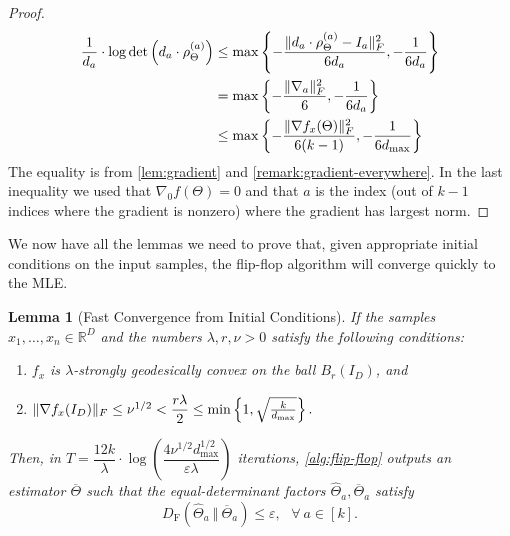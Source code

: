 \documentclass[aos]{imsart}
\newtheorem{lemma}[theorem]{Lemma}
\theoremstyle{definition}
\numberwithin{equation}{section}
\DeclarePairedDelimiter{\norm}{\lVert}{\rVert}
\newcommand{\R}{{\mathbb{R}}}
\newcommand{\otheta}{\overline{\Theta}}
\newcommand{\htheta}{\widehat{\Theta}}
\newcommand{\eps}{\varepsilon}
\newcommand{\DF}{D_{\operatorname{F}}}
\def\dmax{d_{\max}}
\begin{document}
\begin{proof}
	\begin{align*}
		\frac{1}{d_a} \cdot  \log\det\left(d_a \cdot \rho_\Theta^{(a)} \right) &\leq\max\left\{ - \dfrac{\norm{d_a \cdot \rho_\Theta^{(a)} - I_a}_F^2}{6 d_a}, -\dfrac{1}{6 d_a}\right\} \\
		&= \max\left\{ - \dfrac{\norm{\nabla_a}_F^2 }{6}, -\dfrac{1}{6 d_a}\right\}\\
		&\leq \max\left\{ - \dfrac{\norm{\nabla f_x(\Theta)}_F^2}{6(k-1)}, -\dfrac{1}{6 \dmax}\right\}
	\end{align*}
The equality is from \cref{lem:gradient} and \cref{remark:gradient-everywhere}. In the last inequality we used that $\nabla_0 f(\Theta) = 0$ and that $a$ is the index (out of $k-1$ indices where the gradient is nonzero) where the gradient has largest norm.
\end{proof}

We now have all the lemmas we need to prove that, given appropriate initial conditions on the input samples, the flip-flop algorithm will converge quickly to the MLE.

\begin{lemma}[Fast Convergence from Initial Conditions]\label{lem:fast-convergence-initial-generic}
	If the samples $x_1, \ldots, x_n \in \R^D$ and the numbers $\lambda, r, \nu > 0$ satisfy the following conditions:
	\begin{enumerate}
		\item $f_x$ is $\lambda$-strongly geodesically convex on the ball $B_r(I_D)$, and
		\item $\norm{\nabla f_x (I_D)}_F \leq \nu^{1/2} < \dfrac{r \lambda}{2} \leq \min\left\{1, \sqrt{\frac{k}{\dmax}}\right\}.$

	\end{enumerate}
	Then, in $T = \dfrac{12k}{\lambda} \cdot \log\left( \dfrac{4 \nu^{1/2} \dmax^{1/2} }{\eps \lambda} \right)$ iterations, \cref{alg:flip-flop} outputs an estimator $\otheta$ such that the equal-determinant factors $\htheta_a, \otheta_a$ satisfy
	$$ \DF(\htheta_a \ \Vert  \ \otheta_a) \leq \eps, \ \ \ \forall \ a \in [k].$$
\end{lemma}
\end{document}
